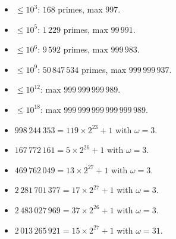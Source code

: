 \begin{itemize}
	\item $\le 10^3$: $168$ primes, max $997$.
	\item $\le 10^5$: $1\,229$ primes, max $99\,991$.
	\item $\le 10^6$: $9\,592$ primes, max $999\,983$.
	\item $\le 10^9$: $50\,847\,534$ primes, max $999\,999\,937$.
	\item $\le 10^{12}$: max $999\,999\,999\,989$.
	\item $\le 10^{18}$: max $999\,999\,999\,999\,999\,989$.
	\item $998\,244\,353 = 119 \times 2^{23} + 1$ with $\omega = 3$.
	\item $167\,772\,161 = 5 \times 2^{26} + 1$ with $\omega = 3$.
	\item $469\,762\,049 = 13 \times 2^{27} + 1$ with $\omega = 3$.
	\item $2\,281\,701\,377 = 17 \times 2^{27} + 1$ with $\omega = 3$.
	\item $2\,483\,027\,969 = 37 \times 2^{26} + 1$ with $\omega = 3$.
	\item $2\,013\,265\,921 = 15 \times 2^{27} + 1$ with $\omega = 31$.
\end{itemize}